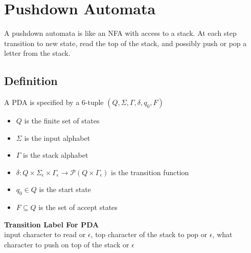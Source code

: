 \documentclass{article}
\begin{document}
\section{Pushdown Automata}
\label{sec:pushdown}
A pushdown automata is like an NFA with access to a stack. At each step transition to new state, read the top of the stack, and possibly push or pop a letter from the stack.
\subsection{Definition}
A PDA is specified by a 6-tuple $(Q,\Sigma,\Gamma,\delta,q_0,F)$\\
\begin{itemize}
    \item $Q$ is the finite set of states
    \item $\Sigma$ is the input alphabet
    \item $\Gamma$ is the stack alphabet
    \item $\delta:Q\times\Sigma_\epsilon\times\Gamma_\epsilon\rightarrow\mathcal{P}(Q\times\Gamma_\epsilon)$ is the transition function
    \item $q_0\in Q$ is the start state
    \item $F\subseteq Q$ is the set of accept states
\end{itemize}
\textbf{Transition Label For PDA}\\
input character to read or $\epsilon$, top character of the stack to pop or $\epsilon$, what character to push on top of the stack or $\epsilon$
\end{document}
